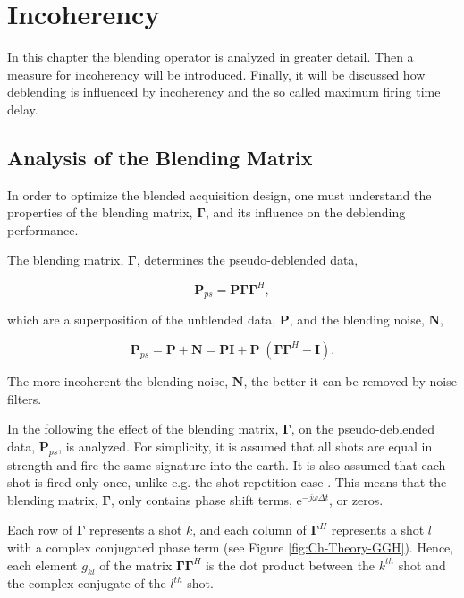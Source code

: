 \chapter{Incoherency} \label{chap:Incoherency}

In this chapter the blending operator is analyzed in greater detail. Then a measure for incoherency will be introduced. Finally, it will be discussed how deblending is influenced by incoherency and the so called maximum firing time delay.

\section{Analysis of the Blending Matrix} \label{sec:BlendingMatrix}

In order to optimize the blended acquisition design, one must understand the properties of the blending matrix, $\mathbf{\Gamma}$, and its influence on the deblending performance.

The blending matrix, $\mathbf{\Gamma}$, determines the pseudo-deblended data,

\begin{equation}
	\mathbf{P}_{ps} = \mathbf{P \Gamma \Gamma}^H,
	\label{eq:Ch-Theory-Pseudo-Deblended-Data}
\end{equation}

which are a superposition of the unblended data, $\mathbf{P}$, and the blending noise, $\mathbf{N}$,

\begin{equation}
	\mathbf{P}_{ps} = \mathbf{P} + \mathbf{N} = \mathbf{P I} + \mathbf{P} \; (\mathbf{\Gamma \Gamma}^H - \mathbf{I}).
	\label{eq:Ch-Theory-PseudoSuperposition}
\end{equation}

The more incoherent the blending noise, $\mathbf{N}$, the better it can be removed by noise filters.

In the following the effect of the blending matrix, $\mathbf{\Gamma}$, on the pseudo-deblended data, $\mathbf{P}_{ps}$, is analyzed. For simplicity, it is assumed that all shots are equal in strength and fire the same signature into the earth. It is also assumed that each shot is fired only once, unlike e.g. the shot repetition case \citep{Sixue}. This means that the blending matrix, $\mathbf{\Gamma}$, only contains phase shift terms, $\mathrm{e}^{-j \omega \Delta t}$, or zeros. 

Each row of $\mathbf{\Gamma}$ represents a shot $k$, and each column of $\mathbf{\Gamma}^H$ represents a shot $l$ with a complex conjugated phase term (see Figure \ref{fig:Ch-Theory-GGH}). Hence, each element $g_{kl}$ of the matrix $\mathbf{\Gamma \Gamma}^H$ is the dot product between the $k^{th}$ shot and the complex conjugate of the $l^{th}$ shot.

